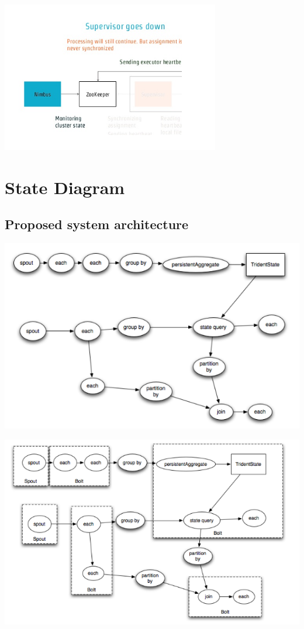 \begin{center}
\includegraphics[scale=.7]{../img/img12} \\[2mm]
\end{center}

\section{State Diagram}
\subsection*{\normalsize Proposed system architecture}
\begin{center}
\includegraphics[scale=.7]{../img/img13} \\[2mm]
\end{center}
\begin{center}
\includegraphics[scale=.7]{../img/img14} \\[2mm]
\end{center}

